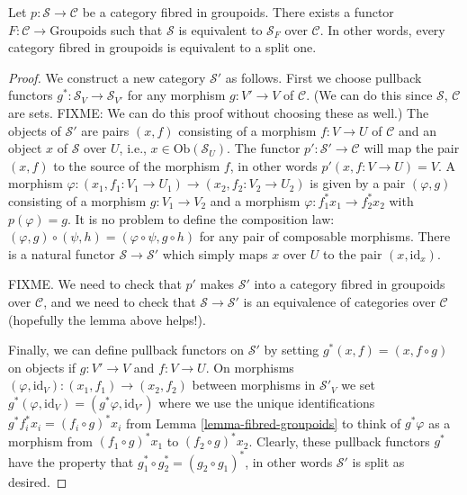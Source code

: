 \begin{lemma} 
\label{lemma-fibred-strict}
Let $ p : \mathcal{S} \to \mathcal{C}$ be a category fibred in groupoids.
There exists a functor $F : \mathcal{C} \to \text{Groupoids}$ such that 
$\mathcal{S}$ is equivalent to $\mathcal{S}_F$ over $\mathcal{C}$. In other 
words, every category fibred in groupoids is equivalent to a split one.
\end{lemma}

\begin{proof} 
We construct a new category $\mathcal{S}'$ as follows. First we choose 
pullback functors $g^\ast : \mathcal{S}_V \to \mathcal{S}_{V'}$ for any 
morphism $g : V' \to V$ of $\mathcal{C}$. (We can do this since 
$\mathcal{S}$, $\mathcal{C}$ are sets. FIXME: We can do this proof without
choosing these as well.) The objects of $\mathcal{S}'$ 
are pairs $(x,f)$ consisting of a morphism $f : V \to U$ of $\mathcal{C}$
and an object $x$ of $\mathcal{S}$ over $U$, i.e., 
$x\in \text{Ob}(\mathcal{S}_U)$. The functor 
$p' : \mathcal{S}' \to \mathcal{C}$ will map the pair $(x,f)$ to the source 
of the morphism $f$, in other words $p'(x,f:V\to U) = V$. A morphism 
$\varphi : (x_1,f_1: V_1 \to U_1) \to (x_2, f_2 : V_2 \to U_2)$ is given by a 
pair $(\varphi,g)$ consisting of a morphism $g : V_1 \to V_2$ and a morphism 
$\varphi : f_1^\ast x_1 \to f_2^\ast x_2$ with $p(\varphi) = g$. It is no 
problem to define the composition law: $(\varphi,g) \circ (\psi,h) = 
(\varphi \circ \psi, g\circ h)$ for any pair of composable morphisms. 
There is a natural functor $\mathcal{S} \to \mathcal{S}'$ which simply maps
$x$ over $U$ to the pair $(x, \text{id}_x)$.

\smallskip\noindent
FIXME. We need to check that $p'$ makes $\mathcal{S}'$ into a category
fibred in groupoids over $\mathcal{C}$, and we need to check that 
$\mathcal{S} \to \mathcal{S}'$ is an equivalence of categories over 
$\mathcal{C}$ (hopefully the lemma above helps!). 

\smallskip\noindent
Finally, we can define pullback functors on $\mathcal{S}'$ 
by setting $g^\ast(x,f) = (x, f \circ g)$ on objects if $g : V' \to V$ and
$f : V \to U$. On morphisms $(\varphi,\text{id}_V) : (x_1, f_1) \to (x_2,f_2)$
between morphisms in $\mathcal{S}'_V$ we set $g^\ast(\varphi,\text{id}_V) =
(g^\ast\varphi, \text{id}_{V'})$ where we use the unique identifications
$g^\ast f_i^\ast x_i = (f_i \circ g)^\ast x_i$ from Lemma 
\ref{lemma-fibred-groupoids} to think of $g^\ast\varphi$ as a morphism from
$(f_1 \circ g)^\ast x_1$ to $(f_2 \circ g)^\ast x_2$. Clearly, these pullback
functors $g^\ast$ have the property that
$g_1^\ast \circ g_2^\ast = (g_2\circ g_1)^\ast$, in other words $\mathcal{S}'$
is split as desired.
\end{proof}

